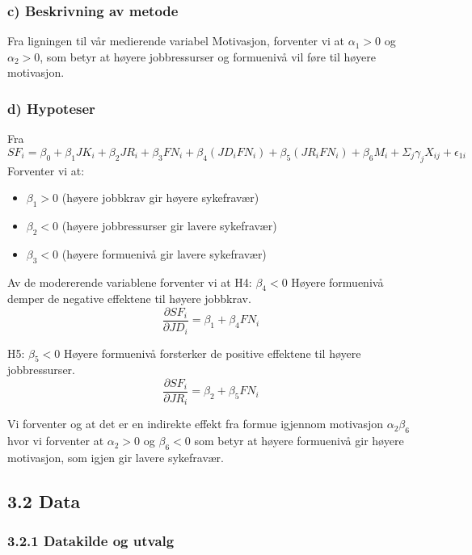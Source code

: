 \documentclass[
  12pt,
  a4paper,
  DIV=11,
  numbers=noendperiod]{scrartcl}
\begin{document}
\subsubsection{c) Beskrivning av metode}\label{c-beskrivning-av-metode}

Fra ligningen til vår medierende variabel Motivasjon, forventer vi at
\(\alpha_1 > 0\) og \(\alpha_2 > 0\), som betyr at høyere jobbressurser
og formuenivå vil føre til høyere motivasjon.

\subsubsection{d) Hypoteser}\label{d-hypoteser}

Fra \[
SF_i = \beta_0 + \beta_1 JK_i + \beta_2 JR_i + \beta_3 FN_i + \beta_4 (JD_i FN_i) + \beta_5 (JR_i FN_i) + \beta_6 M_i + \Sigma_j \gamma_{j}X_{ij} + \epsilon_{1i}
\] Forventer vi at:

\begin{itemize}
    \item $\beta_1 > 0$ (høyere jobbkrav gir høyere sykefravær)
    \item $\beta_2 < 0$ (høyere jobbressurser gir lavere sykefravær)
    \item $\beta_3 < 0$ (høyere formuenivå gir lavere sykefravær)
\end{itemize}

Av de modererende variablene forventer vi at H4: \(\beta_4 < 0\) Høyere
formuenivå demper de negative effektene til høyere jobbkrav. \[
\frac{\partial SF_i}{\partial JD_i} = \beta_1 + \beta_4 FN_i
\]

H5: \(\beta_5 < 0\) Høyere formuenivå forsterker de positive effektene
til høyere jobbressurser. \[
\frac{\partial SF_i}{\partial JR_i} = \beta_2 + \beta_5 FN_i
\]

Vi forventer og at det er en indirekte effekt fra formue igjennom
motivasjon \(\alpha_2 \beta_6\) hvor vi forventer at \(\alpha_2 > 0\) og
\(\beta_6 < 0\) som betyr at høyere formuenivå gir høyere motivasjon,
som igjen gir lavere sykefravær.

\subsection{3.2 Data}\label{data}

\subsubsection{3.2.1 Datakilde og utvalg}\label{datakilde-og-utvalg}
\end{document}
